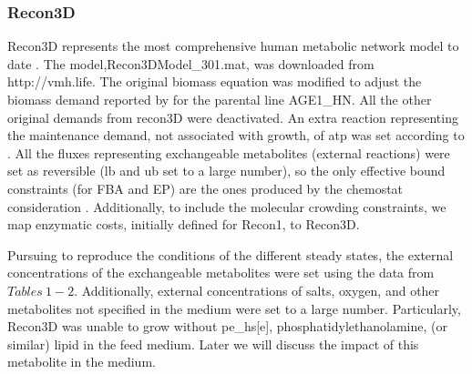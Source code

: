 	\subsubsection{Recon3D}
	
	Recon3D represents the most comprehensive human metabolic network model to date \cite{Brunk2018}. The model,Recon3DModel\_301.mat, was downloaded from http://vmh.life. The original biomass equation was modified to adjust the biomass demand reported by \cite{Niklas2013} for the parental line AGE1\_HN. All the other original demands from recon3D were deactivated. An extra reaction representing the maintenance demand, not associated with growth, of atp was set according to \cite{Fernandez-de-Cossio-Diaz2018b}. All the fluxes representing exchangeable metabolites (external reactions) were set as reversible (lb and ub set to a large number), so the only effective bound constraints (for FBA and EP) are the ones produced by the chemostat consideration \cite{Fernandez-de-Cossio-Diaz2018b}. Additionally, to include the molecular crowding constraints, we map \cite{Shlomi2011} enzymatic costs, initially defined for Recon1, to Recon3D.
	
	Pursuing to reproduce the conditions of the different steady states, the external concentrations of the exchangeable metabolites were set using the data from $Tables\ 1-2$. Additionally, external concentrations of salts, oxygen, and other metabolites not specified in the medium were set to a large number. Particularly, Recon3D was unable to grow without pe\_hs[e], phosphatidylethanolamine, (or similar) lipid in the feed medium. Later we will discuss the impact of this metabolite in the medium. 